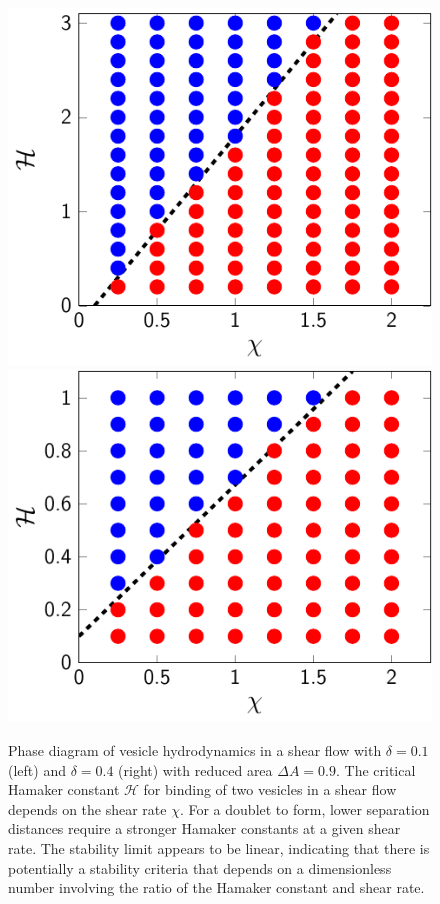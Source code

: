 \documentclass[prf,superscriptaddress,showkeys]{revtex4-1}
\begin{document}
\begin{figure}
  \centering
  \includegraphics[height=0.37\textwidth]{figs/shear_adR1em1_ra090_phaseDiagram.pdf}
  \includegraphics[height=0.37\textwidth]{figs/shear_adR4em1_ra090_phaseDiagram.pdf}
  \caption{\label{fig:sflow_phase_diagram} Phase diagram of vesicle
  hydrodynamics in a shear flow with $\delta = 0.1$ (left) and $\delta =
  0.4$ (right) with reduced area $\Delta A = 0.9$. The critical Hamaker
  constant $\mathcal{H}$ for binding of two vesicles in a shear flow
  depends on the shear rate $\chi$.  For a doublet to form, lower
  separation distances require a stronger Hamaker constants at a given
  shear rate.  The stability limit appears to be linear, indicating that
  there is potentially a stability criteria that depends on a
  dimensionless number involving the ratio of the Hamaker constant and
  shear rate.}
\end{figure}
\end{document}

